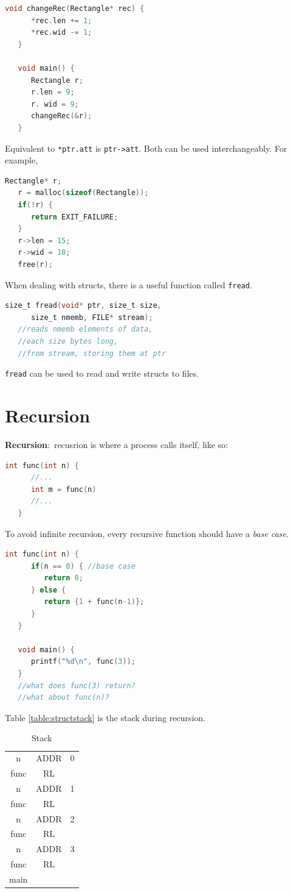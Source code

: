\documentclass[nobib]{tufte-handout}
\newcommand{\defn}[2]{\noindent\textbf{#1}:\ #2}
\begin{document}
\begin{lstlisting}[language=C,caption=changeRec pointer]
   void changeRec(Rectangle* rec) {
      *rec.len += 1;
      *rec.wid -= 1;
   }

   void main() {
      Rectangle r;
      r.len = 9;
      r. wid = 9;
      changeRec(&r);
   }
\end{lstlisting}
Equivalent to \texttt{*ptr.att} is \texttt{ptr->att}. Both can be used 
interchangeably. For example, 
\begin{lstlisting}[language=C,caption=-> and malloc]
   Rectangle* r;
   r = malloc(sizeof(Rectangle));
   if(!r) {
      return EXIT_FAILURE;
   }
   r->len = 15;
   r->wid = 10;
   free(r);
\end{lstlisting}
When dealing with structs, there is a useful function called \texttt{fread}. 
\begin{lstlisting}[language=C,caption=fread]
   size_t fread(void* ptr, size_t size, 
      size_t nmemb, FILE* stream);
   //reads nmemb elements of data, 
   //each size bytes long, 
   //from stream, storing them at ptr
\end{lstlisting}
\texttt{fread} can be used to read and write structs to files.

\pagebreak 

\section{Recursion}
\defn{Recursion}{recusrion is where a process calls itself}, like so:
\begin{lstlisting}[language=C,caption=recursion]
   int func(int n) {
      //...
      int m = func(n)
      //...
   }
\end{lstlisting}
To avoid infinite recursion, every recursive function should 
have a \emph{base case}. 
\begin{lstlisting}[language=C,caption=recursion]
   int func(int n) {
      if(n == 0) { //base case
         return 0;
      } else {
         return {1 + func(n-1)};
      }
   }

   void main() {
      printf("%d\n", func(3));
   }
   //what does func(3) return?
   //what about func(n)?
\end{lstlisting}
Table \ref{table:structstack} is the stack during recursion. 
\begin{table}[h]
   \centering
   \caption{Stack}
   \label{table:stackrecur}
   \begin{tabular}{|c c c|}
      \hline
      n & ADDR & 0 \\
      func & RL & \\
      \hline
      n & ADDR & 1 \\
      func & RL & \\
      \hline
      n & ADDR & 2 \\
      func & RL & \\
      \hline
      n & ADDR & 3 \\
      func & RL & \\
      \hline
      main & & \\
      \hline
   \end{tabular}
\end{table}
\end{document}
